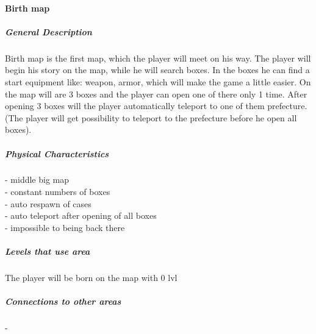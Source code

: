 \documentclass[parskip=full]{scrartcl}
\begin{document}
					\paragraph{Birth map}\vspace{-0.5cm}
						\subparagraph{General Description} \vspace{-0.5cm}
							\par \begingroup
							\leftskip=2cm
							\noindent
									Birth map is the first map, which the player will meet on his way. The player will begin his story on the map, while he will search boxes. In the boxes he can find a start equipment like: weapon, armor, which will make the game a little easier. On the map will are 3 boxes and the player can open one of there only 1 time. After opening 3 boxes will the player automatically teleport to one of them prefecture. (The player will get possibility to teleport to the prefecture before he open all boxes).
							\par \endgroup
						\subparagraph{Physical Characteristics} \vspace{-0.5cm}
							\par \begingroup
							\leftskip=2cm
							\noindent
									- middle big map \\
									- constant numbers of boxes \\
									- auto respawn of cases \\
									- auto teleport after opening of all boxes \\
									- impossible to being back there
							\par \endgroup
						\subparagraph{Levels that use area} \vspace{-0.5cm}
							\par \begingroup
							\leftskip=2cm
							\noindent
									The player will be born on the map with 0 lvl 
							\par \endgroup
						\subparagraph{Connections to other areas} \vspace{-0.5cm}
							\par \begingroup
							\leftskip=2cm
							\noindent
									- 
							\par \endgroup
\end{document}
